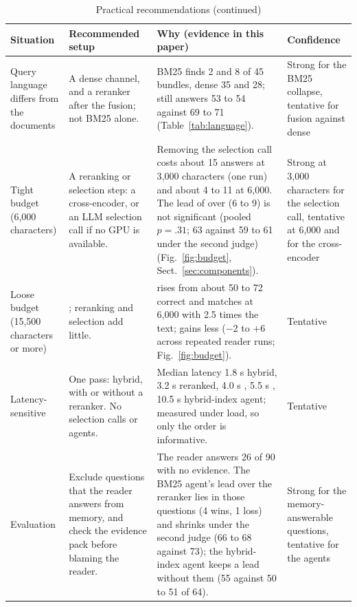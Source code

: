 \begin{table}[tp]
\addtocounter{table}{-1}\renewcommand{\theHtable}{\thetable.cont}
\caption{Practical recommendations (continued)}
\centering
\footnotesize
\setlength{\tabcolsep}{3pt}
\renewcommand{\arraystretch}{1.02}
\begin{tabularx}{\textwidth}{@{}>{\raggedright\arraybackslash}p{2.3cm}>{\raggedright\arraybackslash}p{3.4cm}>{\raggedright\arraybackslash}X>{\raggedright\arraybackslash}p{2.2cm}@{}}
\toprule
Situation & Recommended setup & Why (evidence in this paper) & Confidence \\
\midrule
Query language differs from the documents & A dense channel, and a reranker after the fusion; not BM25 alone. & BM25 finds 2 and 8 of 45 bundles, dense 35 and 28; \hr{} still answers 53 to 54 against 69 to 71 (Table~\ref{tab:language}). & Strong for the BM25 collapse, tentative for fusion against dense \\
Tight budget (6,000 characters) & A reranking or selection step: a cross-encoder, or an LLM selection call if no GPU is available. & Removing the selection call costs about 15 answers at 3,000 characters (one run) and about 4 to 11 at 6,000. The lead of \hr{} over \hybrid{} (6 to 9) is not significant (pooled $p=.31$; 63 against 59 to 61 under the second judge) (Fig.~\ref{fig:budget}, Sect.~\ref{sec:components}). & Strong at 3,000 characters for the selection call, tentative at 6,000 and for the cross-encoder \\
Loose budget (15,500 characters or more) & \hybrid{}; reranking and selection add little. & \hybrid{} rises from about 50 to 72 correct and matches \lexb{} at 6,000 with 2.5 times the text; \hr{} gains less ($-$2 to +6 across repeated reader runs; Fig.~\ref{fig:budget}). & Tentative \\
Latency-sensitive & One pass: hybrid, with or without a reranker. No selection calls or agents. & Median latency 1.8 s hybrid, 3.2 s reranked, 4.0 s \lexb{}, 5.5 s \setr{}, 10.5 s hybrid-index agent; measured under load, so only the order is informative. & Tentative \\
Evaluation & Exclude questions that the reader answers from memory, and check the evidence pack before blaming the reader. & The reader answers 26 of 90 with no evidence. The BM25 agent's lead over the reranker lies in those questions (4 wins, 1 loss) and shrinks under the second judge (66 to 68 against 73); the hybrid-index agent keeps a lead without them (55 against 50 to 51 of 64). & Strong for the memory-answerable questions, tentative for the agents \\
\bottomrule
\end{tabularx}
\end{table}
